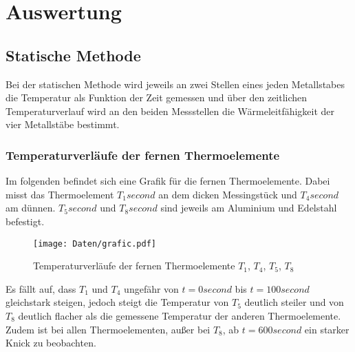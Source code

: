 \newpage
\section{Auswertung}
    \subsection{Statische Methode}
        Bei der statischen Methode wird jeweils an zwei Stellen eines jeden Metallstabes die Temperatur als Funktion der Zeit gemessen und über den zeitlichen
        Temperaturverlauf wird an den beiden Messstellen die Wärmeleitfähigkeit der vier Metallstäbe bestimmt.

        \subsubsection{Temperaturverläufe der fernen Thermoelemente}
        Im folgenden befindet sich eine Grafik für die fernen Thermoelemente. Dabei misst das Thermoelement $T_1 \si{second}$ an dem dicken Messingstück und $T_4 \si{second}$ am dünnen. $T_5 \si{second}$ und $T_8 \si{second}$ sind
        jeweils am Aluminium und Edelstahl befestigt.

        \begin{figure}
               \centering
               \texttt{[image: Daten/grafic.pdf]}
               \caption{Temperaturverläufe der fernen Thermoelemente $T_1$, $T_4$, $T_5$, $T_8$}
               \label{fig:static_far}
        \end{figure}

        Es fällt auf, dass $T_1$ und $T_4$ ungefähr von $t = 0 \si{second}$ bis $t = 100 \si{second}$ gleichstark steigen, jedoch steigt die Temperatur von $T_5$ deutlich steiler und von $T_8$ deutlich 
        flacher als die gemessene Temperatur der anderen Thermoelemente.
        Zudem ist bei allen Thermoelementen, außer bei $T_8$, ab $t = 600 \si{second}$ ein starker Knick zu beobachten.




